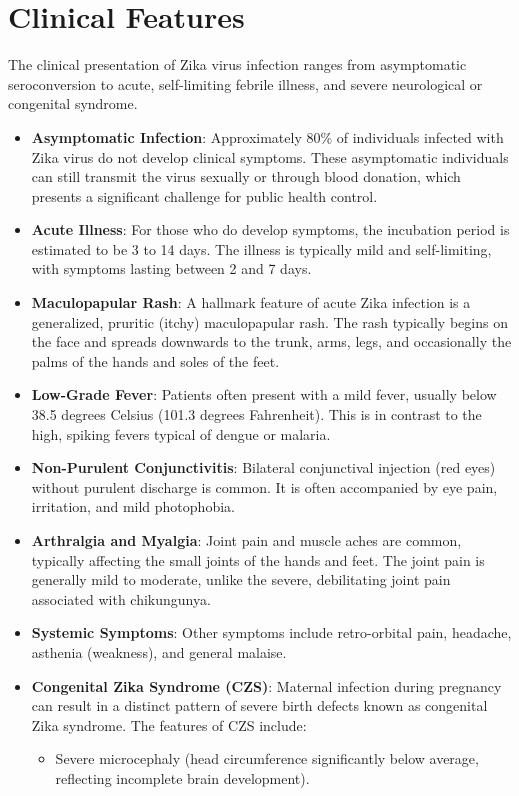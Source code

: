 \section*{Clinical Features}
The clinical presentation of Zika virus infection ranges from asymptomatic seroconversion to acute, self-limiting febrile illness, and severe neurological or congenital syndrome.
\begin{itemize}
\item \textbf{Asymptomatic Infection}: Approximately 80\% of individuals infected with Zika virus do not develop clinical symptoms. These asymptomatic individuals can still transmit the virus sexually or through blood donation, which presents a significant challenge for public health control.
\item \textbf{Acute Illness}: For those who do develop symptoms, the incubation period is estimated to be 3 to 14 days. The illness is typically mild and self-limiting, with symptoms lasting between 2 and 7 days.
\item \textbf{Maculopapular Rash}: A hallmark feature of acute Zika infection is a generalized, pruritic (itchy) maculopapular rash. The rash typically begins on the face and spreads downwards to the trunk, arms, legs, and occasionally the palms of the hands and soles of the feet.
\item \textbf{Low-Grade Fever}: Patients often present with a mild fever, usually below 38.5 degrees Celsius (101.3 degrees Fahrenheit). This is in contrast to the high, spiking fevers typical of dengue or malaria.
\item \textbf{Non-Purulent Conjunctivitis}: Bilateral conjunctival injection (red eyes) without purulent discharge is common. It is often accompanied by eye pain, irritation, and mild photophobia.
\item \textbf{Arthralgia and Myalgia}: Joint pain and muscle aches are common, typically affecting the small joints of the hands and feet. The joint pain is generally mild to moderate, unlike the severe, debilitating joint pain associated with chikungunya.
\item \textbf{Systemic Symptoms}: Other symptoms include retro-orbital pain, headache, asthenia (weakness), and general malaise.
\item \textbf{Congenital Zika Syndrome (CZS)}: Maternal infection during pregnancy can result in a distinct pattern of severe birth defects known as congenital Zika syndrome. The features of CZS include:
  \begin{itemize}
  \item Severe microcephaly (head circumference significantly below average, reflecting incomplete brain development).

\end{itemize}
\end{itemize}
